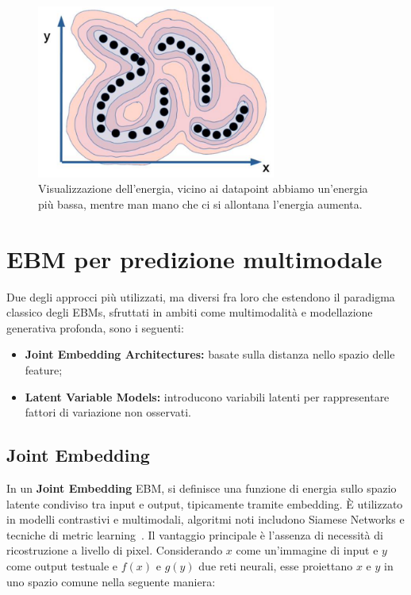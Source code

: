 \begin{figure}
    \centering
    \includegraphics[width=0.7\textwidth]{figure/LowEnHighEn.png}
    \caption{Visualizzazione dell'energia, vicino ai datapoint abbiamo un'energia più bassa, mentre man mano che ci si allontana l'energia aumenta.}
    \label{fig:lEnhEn}
\end{figure}

\section{EBM per predizione multimodale}

Due degli approcci più utilizzati, ma diversi fra loro che estendono il paradigma classico degli EBMs, sfruttati in ambiti come multimodalità e modellazione generativa profonda, sono i seguenti:

\begin{itemize}
    \item \textbf{Joint Embedding Architectures:} basate sulla distanza nello spazio delle feature;
    \item \textbf{Latent Variable Models:} introducono variabili latenti per rappresentare fattori di variazione non osservati.
\end{itemize}

\subsection{Joint Embedding}

In un \textbf{Joint Embedding} EBM, si definisce una funzione di energia sullo spazio latente condiviso tra input e output, tipicamente tramite embedding. È utilizzato in modelli contrastivi e multimodali, algoritmi noti includono Siamese Networks e tecniche di metric learning~\cite{bromley1993signature, chopra2005learning, hadsell2006dimensionality}. Il vantaggio principale è l'assenza di necessità di ricostruzione a livello di pixel. Considerando $x$ come un'immagine di input e $y$ come output testuale e $f(x)$ e $g(y)$ due reti neurali, esse proiettano $x$ e $y$ in uno spazio comune nella seguente maniera:

